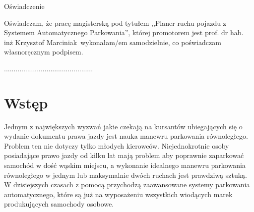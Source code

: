 \documentclass[a4paper,11pt,twoside]{report}
\theoremstyle{definition}
\newcommand{\tytul}{Planer ruchu pojazdu z Systemem Automatycznego Parkowania}
\renewcommand{\title}{Vehicle path planner with Automatic Parking System}
\newcommand{\type}{magisters} %
\newcommand{\supervisor}{prof. dr hab. inż Krzysztof Marciniak}
\begin{document}
\begin{center}
Oświadczenie %
\end{center}

\indent Oświadczam, że pracę \type ką pod
tytułem ,,\tytul '', której promotorem jest \supervisor \ wykonałam/em
samodzielnie, co poświadczam własnoręcznym podpisem.
\vspace{2cm}



\begin{flushright}
  \begin{minipage}{50mm}
    \begin{center}
      ..............................................

    \end{center}
  \end{minipage}
\end{flushright}

\thispagestyle{empty}
\newpage

\null\thispagestyle{empty}\newpage

\tableofcontents
\thispagestyle{empty}
\newpage
\null\thispagestyle{empty}\newpage
\setcounter{page}{11}
\pagestyle{fancy}


\chapter*{Wstęp} %

Jednym z największych wyzwań jakie czekają na kursantów ubiegających się o wydanie dokumentu prawa jazdy jest nauka manewru parkowania równoległego. Problem  ten nie dotyczy tylko młodych kierowców. Niejednokrotnie osoby posiadające prawo jazdy od kilku lat mają problem aby poprawnie zaparkować samochód w dość wąskim miejscu, a wykonanie idealnego manewru parkowania równoległego w jednym lub maksymalnie dwóch ruchach jest prawdziwą sztuką. W dzisiejszych czasach z pomocą przychodzą zaawansowane systemy parkowania automatycznego, które są już na wyposażeniu wszystkich wiodących marek produkujących samochody osobowe. 
\end{document}
